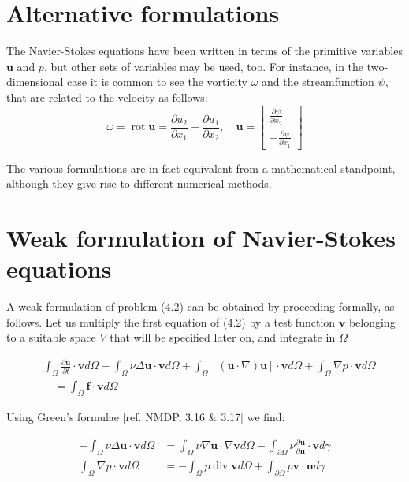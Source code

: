 \documentclass[11pt]{book}
\begin{document}
\section{Alternative formulations}
The Navier-Stokes equations have been written in terms of the primitive variables $\mathbf{u}$ and $p$, but other sets of variables may be used, too. For instance, in the two-dimensional case it is common to see the vorticity $\omega$ and the streamfunction $\psi$, that are related to the velocity as follows:
$$
\omega=\operatorname{rot} \mathbf{u}=\frac{\partial u_{2}}{\partial x_{1}}-\frac{\partial u_{1}}{\partial x_{2}}, \quad \mathbf{u}=\left[\begin{array}{c}
\frac{\partial \psi}{\partial x_{2}} \\
-\frac{\partial \psi}{\partial x_{1}}
\end{array}\right]
$$

The various formulations are in fact equivalent from a mathematical standpoint, although they give rise to different numerical methods. 



\section{Weak formulation of Navier-Stokes equations}
A weak formulation of problem (4.2) can be obtained by proceeding formally, as follows. Let us multiply the first equation of (4.2) by a test function $\mathbf{v}$ belonging to a suitable space $V$ that will be specified later on, and integrate in $\Omega$

$$
\begin{aligned}
& \int_{\Omega} \frac{\partial \mathbf{u}}{\partial t} \cdot \mathbf{v} d \Omega-\int_{\Omega} \nu \Delta \mathbf{u} \cdot \mathbf{v} d \Omega+\int_{\Omega}[(\mathbf{u} \cdot \nabla) \mathbf{u}] \cdot \mathbf{v} d \Omega+\int_{\Omega} \nabla p \cdot \mathbf{v} d \Omega \\
& \quad=\int_{\Omega} \mathbf{f} \cdot \mathbf{v} d \Omega
\end{aligned}
$$

Using Green's formulae [ref. NMDP, 3.16 \& 3.17] we find:

$$
\begin{aligned}
-\int_{\Omega} \nu \Delta \mathbf{u} \cdot \mathbf{v} d \Omega & =\int_{\Omega} \nu \nabla \mathbf{u} \cdot \nabla \mathbf{v} d \Omega-\int_{\partial \Omega} \nu \frac{\partial \mathbf{u}}{\partial \mathbf{n}} \cdot \mathbf{v} d \gamma \\
\int_{\Omega} \nabla p \cdot \mathbf{v} d \Omega & =-\int_{\Omega} p \operatorname{div} \mathbf{v} d \Omega+\int_{\partial \Omega} p \mathbf{v} \cdot \mathbf{n} d \gamma
\end{aligned}
$$
\end{document}
